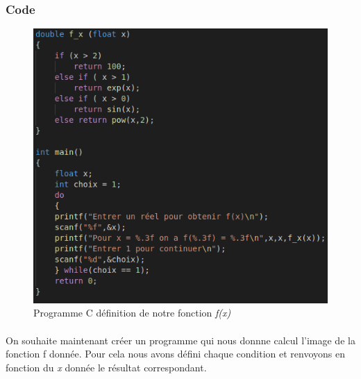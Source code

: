 \documentclass[10pt,a4paper]{article}
\begin{document}
\subsubsection{Code}
\begin{figure}[h]
\begin{center}
\includegraphics[scale=.3]{images/f_x_x}
\end{center}
\caption{Programme C définition de notre fonction \emph{f(x)}}
\end{figure}
\paragraph{}
On souhaite maintenant créer un programme qui nous donnne calcul l'image de la fonction f donnée. Pour cela nous 
avons défini chaque condition et renvoyons en fonction du \emph{x} donnée le résultat correspondant.
\end{document}
